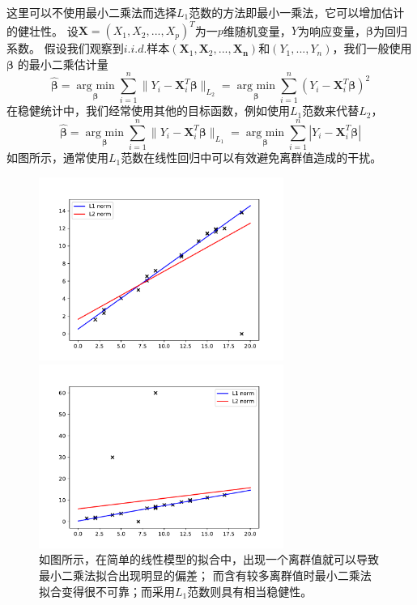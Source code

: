 这里可以不使用最小二乘法而选择$L_1$范数的方法即最小一乘法，它可以增加估计的健壮性。
设$\bm{X} = (X_1, X_2, ..., X_p)^T$为一$p$维随机变量，$Y$为响应变量，$\bm{\beta}$为回归系数。
假设我们观察到$i.i.d. $样本$(\bm{X}_1, \bm{X}_2, ..., \bm{X_n})$和$(Y_1, ..., Y_n)$，我们一般使用$\bm{\beta}$
的最小二乘估计量
$$\hat{\bm{\beta}} = \underset{\bm{\beta}}{\operatorname{arg\ min}} \sum_{i=1}^n\|Y_i - \bm{X}^T_i\bm{\beta}\|_{L_2}
=\underset{\bm{\beta}}{\operatorname{arg\ min}} \sum_{i=1}^n(Y_i - \bm{X}^T_i\bm{\beta})^2$$
在稳健统计中，我们经常使用其他的目标函数，例如使用$L_1$范数来代替$L_2$，
$$\hat{\bm{\beta}} = \underset{\bm{\beta}}{\operatorname{arg\ min}} \sum_{i=1}^n\|Y_i - \bm{X}^T_i\bm{\beta}\|_{L_1}
=\underset{\bm{\beta}}{\operatorname{arg\ min}} \sum_{i=1}^n|Y_i - \bm{X}^T_i\bm{\beta}|$$
如图所示，通常使用$L_1$范数在线性回归中可以有效避免离群值造成的干扰。
\begin{figure}[H]
    \centering
    \begin{minipage}[t]{0.48\textwidth}
    \includegraphics[width=8cm]{pics/l1-l2-diff2.pdf}
    \end{minipage}
    \begin{minipage}[t]{0.48\textwidth}
    \includegraphics[width=8cm]{pics/l1-l2-diff.pdf}
    \end{minipage}
    \caption{\small 如图所示，在简单的线性模型的拟合中，出现一个离群值就可以导致最小二乘法拟合出现明显的偏差；
    而含有较多离群值时最小二乘法拟合变得很不可靠；而采用$L_1$范数则具有相当稳健性。}
    \label{fig2.1}
\end{figure}

